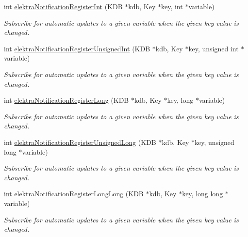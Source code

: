 \begin{DoxyCompactItemize}
\item 
int \mbox{\hyperlink{group__kdbnotification_ga362d557489c4199f6c765480a8a3cade}{elektra\+Notification\+Register\+Int}} (K\+DB $\ast$kdb, Key $\ast$key, int $\ast$variable)
\begin{DoxyCompactList}\small\item\em Subscribe for automatic updates to a given variable when the given key value is changed. \end{DoxyCompactList}\item 
int \mbox{\hyperlink{group__kdbnotification_ga940c1014f72e01b4145c418e87efa492}{elektra\+Notification\+Register\+Unsigned\+Int}} (K\+DB $\ast$kdb, Key $\ast$key, unsigned int $\ast$variable)
\begin{DoxyCompactList}\small\item\em Subscribe for automatic updates to a given variable when the given key value is changed. \end{DoxyCompactList}\item 
int \mbox{\hyperlink{group__kdbnotification_ga1130c58dc89f5838ca1c7d625e04bc92}{elektra\+Notification\+Register\+Long}} (K\+DB $\ast$kdb, Key $\ast$key, long $\ast$variable)
\begin{DoxyCompactList}\small\item\em Subscribe for automatic updates to a given variable when the given key value is changed. \end{DoxyCompactList}\item 
int \mbox{\hyperlink{group__kdbnotification_ga8ba57c05dcd561b266f3a32aa687d4ea}{elektra\+Notification\+Register\+Unsigned\+Long}} (K\+DB $\ast$kdb, Key $\ast$key, unsigned long $\ast$variable)
\begin{DoxyCompactList}\small\item\em Subscribe for automatic updates to a given variable when the given key value is changed. \end{DoxyCompactList}\item 
int \mbox{\hyperlink{group__kdbnotification_ga59593e7b3b2b5e32ec0d5cf611e3704c}{elektra\+Notification\+Register\+Long\+Long}} (K\+DB $\ast$kdb, Key $\ast$key, long long $\ast$variable)
\begin{DoxyCompactList}\small\item\em Subscribe for automatic updates to a given variable when the given key value is changed. \end{DoxyCompactList}\item 

\end{DoxyCompactItemize}
